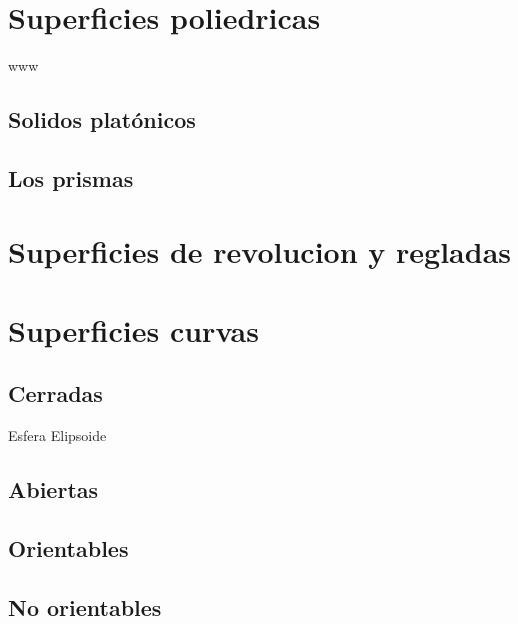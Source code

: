 \documentclass[16pt,]{krantz}
\theoremstyle{definition}
\theoremstyle{definition}
\theoremstyle{definition}
\theoremstyle{definition}
\theoremstyle{remark}
\begin{document}
\hypertarget{superficies-poliedricas}{%
\section{Superficies poliedricas}\label{superficies-poliedricas}}

www

\hypertarget{solidos-platuxf3nicos}{%
\subsection{Solidos platónicos}\label{solidos-platuxf3nicos}}

\hypertarget{los-prismas}{%
\subsection{Los prismas}\label{los-prismas}}

\hypertarget{superficies-de-revolucion-y-regladas}{%
\section{Superficies de revolucion y regladas}\label{superficies-de-revolucion-y-regladas}}

\hypertarget{superficies-curvas}{%
\section{Superficies curvas}\label{superficies-curvas}}

\hypertarget{cerradas}{%
\subsection{Cerradas}\label{cerradas}}

Esfera Elipsoide

\hypertarget{abiertas}{%
\subsection{Abiertas}\label{abiertas}}

\hypertarget{orientables}{%
\subsection{Orientables}\label{orientables}}

\hypertarget{no-orientables}{%
\subsection{No orientables}\label{no-orientables}}
\end{document}
